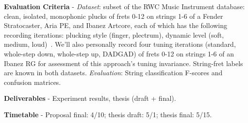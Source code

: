 \documentclass[12pt]{cmuthesis}
\begin{document}
\noindent
\textbf{Evaluation Criteria} - \textit{Dataset}: subset of the RWC Music Instrument database: clean, isolated, monophonic plucks of frets 0-12 on strings 1-6 of a Fender Stratocaster, Aria PE, and Ibanez Artcore, each of which has the following recording iterations: plucking style (finger, plectrum), dynamic level (soft, medium, loud)~\cite{goto2003}. We'll also personally record four tuning iterations (standard, whole-step down, whole-step up, DADGAD) of frets 0-12 on strings 1-6 of an Ibanez RG for assessment of this approach's tuning invariance. String-fret labels are known in both datasets. \textit{Evaluation}: String classification F-scores and confusion matrices.

\noindent
\textbf{Deliverables} - Experiment results, thesis (draft + final).

\noindent
\textbf{Timetable} - Proposal final: 4/10; thesis draft: 5/1; thesis final: 5/15.

%

\backmatter


\renewcommand{\bibsection}{\chapter{\bibname}}

\end{document}
